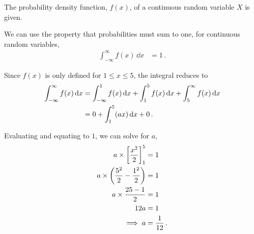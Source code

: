 %
%


\begin{subquestions}
	
\subquestion

The probability density function, $f(x)$, of a continuous random variable $X$ is given.

We can use the property that probabilities must sum to one,  for continuous random variables,
\begin{align}
	\int_{-\infty}^{\infty} f(x)\,\dd x  & = 1 \,.
\end{align}

Since $f(x)$ is only defined for $1 \leq x \leq 5$, the integral reduces to
\begin{align}
	\int_{-\infty}^{\infty} f(x)\,\mathrm{d} x &= \int_{-\infty}^{1} f(x)\,\mathrm{d} x+\int_{1}^{5} f(x)\,\mathrm{d} x+\int_{5}^{\infty} f(x)\,\mathrm{d} x \nonumber \\
	&= 0 + \int_{1}^{5} (ax)\,\mathrm{d} x + 0 \,.
\end{align}

Evaluating and equating to $1$, we can solve for $a$,
\begin{align}
	a \times \left[\frac{x^2}{2}\right]^5_1 & = 1 \nonumber \\
	a \times \left(\frac{5^2}{2}- \frac{1^2}{2}\right) & = 1 \nonumber \\
	a \times \frac{25-1}{2} & = 1 \nonumber \\
	12a & = 1 \nonumber \\
	\implies a & = \frac{1}{12} \,.
\end{align}
	

\subquestion



\end{subquestions}
